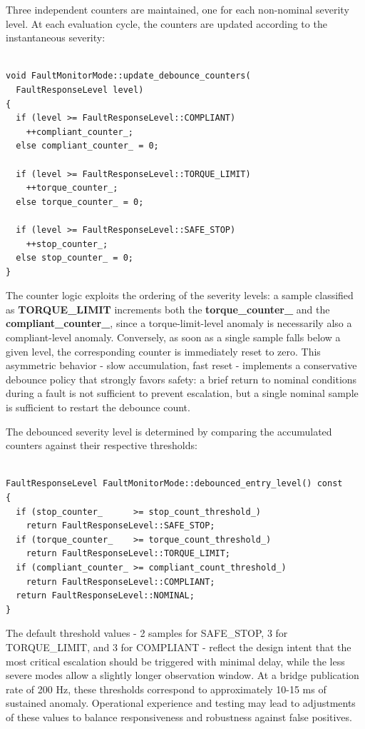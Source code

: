 Three independent counters are maintained, one for each non-nominal severity level. At each evaluation cycle, the counters are updated according to the instantaneous severity:

\begin{verbatim}

void FaultMonitorMode::update_debounce_counters(
  FaultResponseLevel level)
{
  if (level >= FaultResponseLevel::COMPLIANT)
    ++compliant_counter_;
  else compliant_counter_ = 0;

  if (level >= FaultResponseLevel::TORQUE_LIMIT)
    ++torque_counter_;
  else torque_counter_ = 0;

  if (level >= FaultResponseLevel::SAFE_STOP)
    ++stop_counter_;
  else stop_counter_ = 0;
}

\end{verbatim}

The counter logic exploits the ordering of the severity levels: a sample classified as \textbf{TORQUE\_LIMIT} increments both the \textbf{torque\_counter\_} and the \textbf{compliant\_counter\_}, since a torque-limit-level anomaly is necessarily also a compliant-level anomaly. Conversely, as soon as a single sample falls below a given level, the corresponding counter is immediately reset to zero. This asymmetric behavior - slow accumulation, fast reset - implements a conservative debounce policy that strongly favors safety: a brief return to nominal conditions during a fault is not sufficient to prevent escalation, but a single nominal sample is sufficient to restart the debounce count.

The debounced severity level is determined by comparing the accumulated counters against their respective thresholds:

\begin{verbatim}

FaultResponseLevel FaultMonitorMode::debounced_entry_level() const
{
  if (stop_counter_      >= stop_count_threshold_)
    return FaultResponseLevel::SAFE_STOP;
  if (torque_counter_    >= torque_count_threshold_)
    return FaultResponseLevel::TORQUE_LIMIT;
  if (compliant_counter_ >= compliant_count_threshold_)
    return FaultResponseLevel::COMPLIANT;
  return FaultResponseLevel::NOMINAL;
}

\end{verbatim}

The default threshold values - 2 samples for SAFE\_STOP, 3 for TORQUE\_LIMIT, and 3 for COMPLIANT - reflect the design intent that the most critical escalation should be triggered with minimal delay, while the less severe modes allow a slightly longer observation window. At a bridge publication rate of 200 Hz, these thresholds correspond to approximately 10-15 ms of sustained anomaly. Operational experience and testing may lead to adjustments of these values to balance responsiveness and robustness against false positives.

